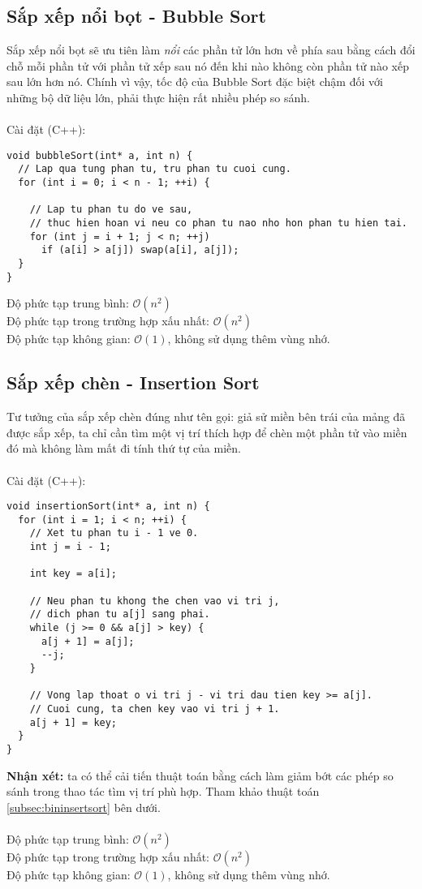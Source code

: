 \documentclass[]{article}
\begin{document}
\subsection{Sắp xếp nổi bọt - Bubble Sort}
Sắp xếp nổi bọt sẽ ưu tiên làm \textit{nổi} các phần tử lớn hơn về phía sau bằng cách đổi chỗ mỗi phần tử với phần tử xếp sau nó đến khi nào không còn phần tử nào xếp sau lớn hơn nó. Chính vì vậy, tốc độ của Bubble Sort đặc biệt chậm đối với những bộ dữ liệu lớn, phải thực hiện rất nhiều phép so sánh.
\\\\
Cài đặt (C++):
\begin{lstlisting}
void bubbleSort(int* a, int n) {
  // Lap qua tung phan tu, tru phan tu cuoi cung.
  for (int i = 0; i < n - 1; ++i) {

    // Lap tu phan tu do ve sau,
    // thuc hien hoan vi neu co phan tu nao nho hon phan tu hien tai.
    for (int j = i + 1; j < n; ++j)
      if (a[i] > a[j]) swap(a[i], a[j]);
  }
}
\end{lstlisting}
Độ phức tạp trung bình: $\mathcal{O}(n^2)$
\\
Độ phức tạp trong trường hợp xấu nhất: $\mathcal{O}(n^2)$
\\
Độ phức tạp không gian: $\mathcal{O}(1)$, không sử dụng thêm vùng nhớ.
\subsection{Sắp xếp chèn - Insertion Sort}
Tư tưởng của sắp xếp chèn đúng như tên gọi: giả sử miền bên trái của mảng đã được sắp xếp, ta chỉ cần tìm một vị trí thích hợp để chèn một phần tử vào miền đó mà không làm mất đi tính thứ tự của miền.
\\\\
Cài đặt (C++):
\begin{lstlisting}
void insertionSort(int* a, int n) {
  for (int i = 1; i < n; ++i) {
    // Xet tu phan tu i - 1 ve 0.
    int j = i - 1;

    int key = a[i];

    // Neu phan tu khong the chen vao vi tri j,
    // dich phan tu a[j] sang phai.
    while (j >= 0 && a[j] > key) {
      a[j + 1] = a[j];
      --j;
    }

    // Vong lap thoat o vi tri j - vi tri dau tien key >= a[j].
    // Cuoi cung, ta chen key vao vi tri j + 1.
    a[j + 1] = key;
  }
}
\end{lstlisting}
\textbf{Nhận xét:} ta có thể cải tiến thuật toán bằng cách làm giảm bớt các phép so sánh trong thao tác tìm vị trí phù hợp. Tham khảo thuật toán \ref{subsec:bininsertsort} bên dưới.
\\\\
Độ phức tạp trung bình: $\mathcal{O}(n^2)$
\\
Độ phức tạp trong trường hợp xấu nhất: $\mathcal{O}(n^2)$
\\
Độ phức tạp không gian: $\mathcal{O}(1)$, không sử dụng thêm vùng nhớ.
\end{document}
